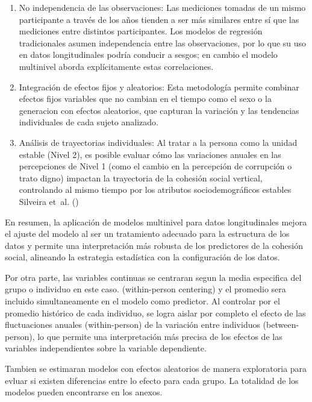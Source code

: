 \documentclass[
  spanish,
  a4paper,
  oneside]{scrbook}
\begin{document}
\begin{enumerate}
\def\labelenumi{\arabic{enumi}.}
\item
  No independencia de las observaciones: Las mediciones tomadas de un
  mismo participante a través de los años tienden a ser más similares
  entre sí que las mediciones entre distintos participantes. Los modelos
  de regresión tradicionales asumen independencia entre las
  observaciones, por lo que su uso en datos longitudinales podría
  conducir a sesgos; en cambio el modelo multinivel aborda
  explícitamente estas correlaciones.
\item
  Integración de efectos fijos y aleatorios: Esta metodología permite
  combinar efectos fijos variables que no cambian en el tiempo como el
  sexo o la generacion con efectos aleatorios, que capturan la variación
  y las tendencias individuales de cada sujeto analizado.
\item
  Análisis de trayectorias individuales: Al tratar a la persona como la
  unidad estable (Nivel 2), es posible evaluar cómo las variaciones
  anuales en las percepciones de Nivel 1 (como el cambio en la
  percepción de corrupción o trato digno) impactan la trayectoria de la
  cohesión social vertical, controlando al mismo tiempo por los
  atributos sociodemográficos estables Silveira et~al.
  ()
\end{enumerate}

En resumen, la aplicación de modelos multinivel para datos
longitudinales mejora el ajuste del modelo al ser un tratamiento
adecuado para la estructura de los datos y permite una interpretación
más robusta de los predictores de la cohesión social, alineando la
estrategia estadística con la configuración de los datos.

Por otra parte, las variables continuas se centraran segun la media
especifica del grupo o individuo en este caso. (within-person centering)
y el promedio sera incluido simultaneamente en el modelo como predictor.
Al controlar por el promedio histórico de cada individuo, se logra
aislar por completo el efecto de las fluctuaciones anuales
(within-person) de la variación entre individuos (between-person), lo
que permite una interpretación más precisa de los efectos de las
variables independientes sobre la variable dependiente.

Tambien se estimaran modelos con efectos aleatorios de manera
exploratoria para evluar si existen diferencias entre lo efecto para
cada grupo. La totalidad de los modelos pueden encontrarse en los
anexos.
\end{document}
